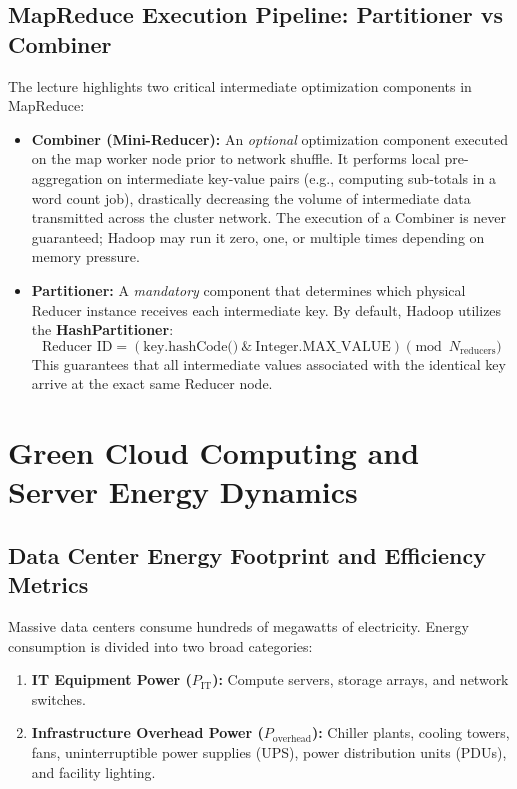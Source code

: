 \subsection{MapReduce Execution Pipeline: Partitioner vs Combiner}
The lecture highlights two critical intermediate optimization components in MapReduce:
\begin{itemize}[leftmargin=*]
  \item \textbf{Combiner (Mini-Reducer):} An \emph{optional} optimization component executed on the map worker node prior to network shuffle. It performs local pre-aggregation on intermediate key-value pairs (e.g., computing sub-totals in a word count job), drastically decreasing the volume of intermediate data transmitted across the cluster network. The execution of a Combiner is never guaranteed; Hadoop may run it zero, one, or multiple times depending on memory pressure.
  \item \textbf{Partitioner:} A \emph{mandatory} component that determines which physical Reducer instance receives each intermediate key. By default, Hadoop utilizes the \textbf{HashPartitioner}:
  \begin{equation}
  \text{Reducer ID} = (\text{key.hashCode()} \ \& \ \text{Integer.MAX\_VALUE}) \pmod{N_{\text{reducers}}}
  \end{equation}
  This guarantees that all intermediate values associated with the identical key arrive at the exact same Reducer node.
\end{itemize}

\section{Green Cloud Computing and Server Energy Dynamics}
\subsection{Data Center Energy Footprint and Efficiency Metrics}
Massive data centers consume hundreds of megawatts of electricity. Energy consumption is divided into two broad categories:
\begin{enumerate}[leftmargin=*]
  \item \textbf{IT Equipment Power ($P_{\text{IT}}$):} Compute servers, storage arrays, and network switches.
  \item \textbf{Infrastructure Overhead Power ($P_{\text{overhead}}$):} Chiller plants, cooling towers, fans, uninterruptible power supplies (UPS), power distribution units (PDUs), and facility lighting.
\end{enumerate}


